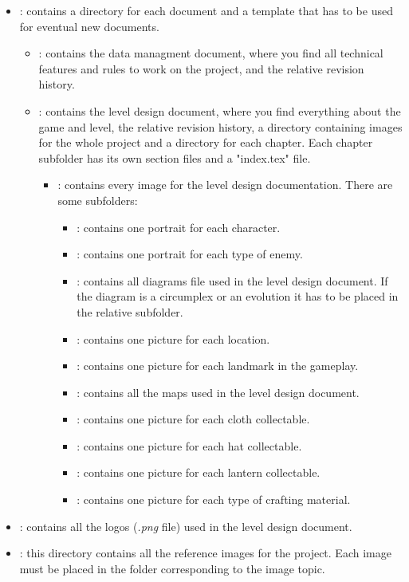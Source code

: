 \begin{itemize}
\item \textbf{}: contains a directory for each document and a template that has to be used for eventual new documents.
  \begin{itemize}
    \item \textbf{}: contains the data managment document, where you find all technical features and rules to work on the project, and the relative revision history.

    \item \textbf{}: contains the level design document, where you find everything about the game and level, the relative revision history, a directory containing images for the whole project and a directory for each chapter. Each chapter subfolder has its own section files and a "index.tex" file.
    \begin{itemize}
    \item \textbf{}: contains every image for the level design documentation. There are some subfolders:
    \begin{itemize}
    \item \textbf{}: contains one portrait for each character.
      \item \textbf{}: contains one portrait for each type of enemy.
      \item \textbf{}: contains all diagrams file used in the level design document. If the diagram is a circumplex or an evolution it has to be placed in the relative subfolder.
      \item \textbf{}: contains one picture for each location.
        \item \textbf{}: contains one picture for each landmark in the gameplay.
        \item \textbf{}: contains all the maps used in the level design document.
        \item \textbf{}: contains one picture for each cloth collectable.
        \item \textbf{}: contains one picture for each hat collectable.
        \item \textbf{}: contains one picture for each lantern collectable.
        \item \textbf{}: contains one picture for each type of crafting material.
    \end{itemize}
\end{itemize}
\end{itemize}
    \item \textbf{}: contains all the logos (\textit{.png} file) used in the level design document.

    \item \textbf{}: this directory contains all the reference images for the project. Each image must be placed in the folder corresponding to the image topic.

\end{itemize}

